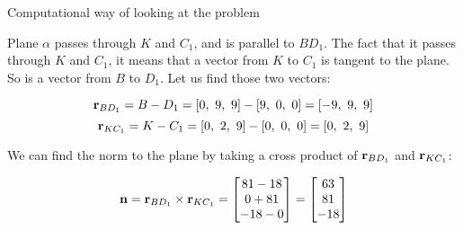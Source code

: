 \documentclass{beamer}
\begin{document}
\begin{frame}{Computational way of looking at the problem}
	\begin{flushleft}
		
		Plane $\alpha$ passes through $K$ and $C_1$, and is parallel to $BD_1$. The fact that it passes through $K$ and $C_1$, it means that a vector from  $K$ to $C_1$ is tangent to the plane. So is a vector from $B$ to $D_1$. Let us find those two vectors:
		
		\begin{equation}
			\bo{r}_{BD_1} = B-D_1 = [0, \ 9,  \ 9]-[9, \ 0,  \ 0] =  [-9, \ 9,  \ 9]
		\end{equation}
%
	\begin{equation}
	\bo{r}_{KC_1} = K-C_1 = [0, \ 2,  \ 9] - [0, \ 0,  \ 0] = [0, \ 2,  \ 9]
	\end{equation}
		
		\bigskip
		
		We can find the norm to the plane by taking a cross product of $\mathbf{r}_{BD_1}$ and $\mathbf{r}_{KC_1}$:
		
\begin{equation}
	\mathbf{n} = \mathbf{r}_{BD_1} \times \mathbf{r}_{KC_1} = \begin{bmatrix}
		81-18 \\
		0+81\\
		-18-0
	\end{bmatrix}
=	
	 \begin{bmatrix}
	 	  63 \\
	 	  81 \\
	 	-18
	 \end{bmatrix}
\end{equation}		
		
	\end{flushleft}
\end{frame}
\end{document}
